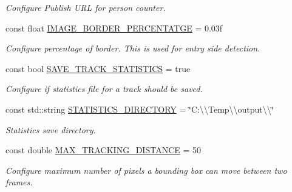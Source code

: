 \begin{DoxyCompactItemize}
\begin{DoxyCompactList}\small\item\em Configure Publish U\+RL for person counter. \end{DoxyCompactList}\item 
\mbox{\label{namespacedto_1_1_configuration_a29c07e1eafe4832c8e1a41fdec4b4eea}} 
const float \mbox{\hyperlink{namespacedto_1_1_configuration_a29c07e1eafe4832c8e1a41fdec4b4eea}{I\+M\+A\+G\+E\+\_\+\+B\+O\+R\+D\+E\+R\+\_\+\+P\+E\+R\+C\+E\+N\+T\+A\+T\+GE}} = 0.\+03f
\begin{DoxyCompactList}\small\item\em Configure percentage of border. This is used for entry side detection. \end{DoxyCompactList}\item 
\mbox{\label{namespacedto_1_1_configuration_a81f5966eb41bf1f77a0c3eb88e0510a4}} 
const bool \mbox{\hyperlink{namespacedto_1_1_configuration_a81f5966eb41bf1f77a0c3eb88e0510a4}{S\+A\+V\+E\+\_\+\+T\+R\+A\+C\+K\+\_\+\+S\+T\+A\+T\+I\+S\+T\+I\+CS}} = true
\begin{DoxyCompactList}\small\item\em Configure if statistics file for a track should be saved. \end{DoxyCompactList}\item 
\mbox{\label{namespacedto_1_1_configuration_ab4d6ecf6073d6cb6199b8d0b925c1edd}} 
const std\+::string \mbox{\hyperlink{namespacedto_1_1_configuration_ab4d6ecf6073d6cb6199b8d0b925c1edd}{S\+T\+A\+T\+I\+S\+T\+I\+C\+S\+\_\+\+D\+I\+R\+E\+C\+T\+O\+RY}} = \char`\"{}C\+:\textbackslash{}\textbackslash{}\+Temp\textbackslash{}\textbackslash{}output\textbackslash{}\textbackslash{}\char`\"{}
\begin{DoxyCompactList}\small\item\em Statistics save directory. \end{DoxyCompactList}\item 
\mbox{\label{namespacedto_1_1_configuration_ae2995451346467ca2a8c205b3294f42a}} 
const double \mbox{\hyperlink{namespacedto_1_1_configuration_ae2995451346467ca2a8c205b3294f42a}{M\+A\+X\+\_\+\+T\+R\+A\+C\+K\+I\+N\+G\+\_\+\+D\+I\+S\+T\+A\+N\+CE}} = 50
\begin{DoxyCompactList}\small\item\em Configure maximum number of pixels a bounding box can move between two frames. \end{DoxyCompactList}\item 

\end{DoxyCompactItemize}
